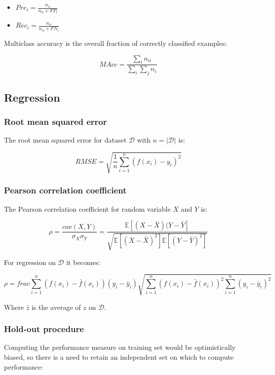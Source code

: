 		\begin{multicols}{2}
			\begin{itemize}
				\item $Pre_i = \frac{n_{ii}}{n_{ii} + FP_i}$
				\item $Rec_i = \frac{n_{ii}}{n_{ii}+FN_i}$
			\end{itemize}
		\end{multicols}

		Multiclass accuracy is the overall fraction of correctly classified examples:

		$$MAcc = \frac{\sum\limits_i n_{ii}}{\sum\limits_i\sum\limits_j n_{i}}$$

	\subsection{Regression}

		\subsubsection{Root mean squared error}
		The root mean squared error for dataset $\mathcal{D}$ with $n = |\mathcal{D}|$ is:

		$$RMSE = \sqrt{\frac{1}{n}\sum\limits_{i=1}^n(f(x_i)-y_i)^2}$$

		\subsubsection{Pearson correlation coefficient}
		The Pearson correlation coefficient for random variable $X$ and $Y$ is:

		$$\rho = \frac{cov(X, Y)}{\sigma_X\sigma_Y} = \frac{\mathbb{E}[(X-\bar{X})(Y-\bar{Y}]}{\sqrt{\mathbb{E}[(X-\bar{X})^2]\mathbb{E}[(Y-\bar{Y})^2]}}$$

		For regression on $\mathcal{D}$ it becomes:

		$$\rho = frac{\sum\limits_{i=1}^n(f(x_i)-\bar{f}(x_i))(y_i-\bar{y}_i)}{\sqrt{\sum\limits_{i=1}^n(f(x_i)-\bar{f}(x_i))^2\sum\limits_{i=1}^n(y_i-\bar{y}_i)^2}}$$

		Where $\bar{z}$ is the average of $z$ on $\mathcal{D}$.

		\subsubsection{Hold-out procedure}
		Computing the performance measure on training set would be optimistically biased, so there is a need to retain an independent set on which to compute performance:

